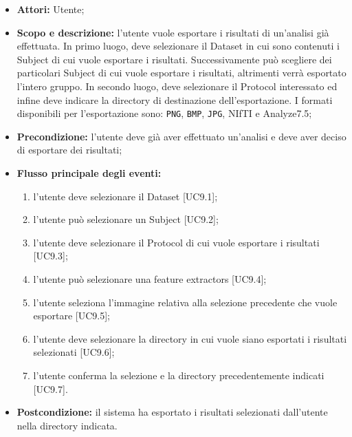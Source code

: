 \begin{itemize}
\item \textbf{Attori:} Utente;
\item \textbf{Scopo e descrizione:} l'utente vuole esportare i risultati di un'analisi già effettuata. In primo luogo, deve selezionare il Dataset\glossario{} in cui sono contenuti i Subject\glossario{} di cui vuole esportare i risultati. Successivamente può scegliere dei particolari Subject\glossario{} di cui vuole esportare i risultati, altrimenti verrà esportato l'intero gruppo. In secondo luogo, deve selezionare il Protocol\glossario{} interessato ed infine deve indicare la directory di destinazione dell'esportazione. I formati disponibili per l'esportazione sono: \verb|PNG|, \verb|BMP|, \verb|JPG|, NIfTI\glossario{} e Analyze7.5;
\item \textbf{Precondizione:} l'utente deve già aver effettuato un'analisi e deve aver deciso di esportare dei risultati;
\item \textbf{Flusso principale degli eventi:}
\begin{enumerate}
\item l'utente deve selezionare il Dataset\glossario{} [UC9.1];
\item l'utente può selezionare un Subject\glossario{} [UC9.2];
\item l'utente deve selezionare il Protocol\glossario{} di cui vuole esportare i risultati [UC9.3];
\item l'utente può selezionare una feature extractors\glossario{} [UC9.4];
\item l'utente seleziona l'immagine relativa alla selezione precedente che vuole esportare [UC9.5];
\item l'utente deve selezionare la directory in cui vuole siano esportati i risultati selezionati [UC9.6];
\item l'utente conferma la selezione e la directory precedentemente indicati [UC9.7].
\end{enumerate}
\item \textbf{Postcondizione:} il sistema ha esportato i risultati selezionati dall'utente nella directory indicata.
\end{itemize}

